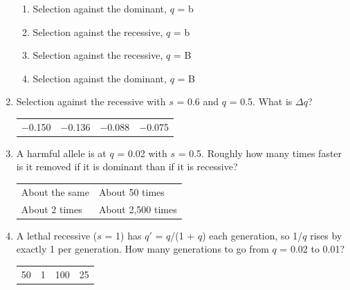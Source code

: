 \documentclass[11pt]{article}
\newcommand{\work}[1]{\par\vspace{#1}}
\begin{document}
\begin{enumerate}[label=\textbf{\arabic*.}, leftmargin=2em, itemsep=1.4em]
\par\smallskip
\begin{enumerate}[label={}, leftmargin=2.4em, labelwidth=0pt, itemsep=2pt, topsep=0pt]
\item \hspace*{-2.4em}Selection against the dominant, \(q\) = b
\item \hspace*{-2.4em}Selection against the recessive, \(q\) = b
\item \hspace*{-2.4em}Selection against the recessive, \(q\) = B
\item \hspace*{-2.4em}Selection against the dominant, \(q\) = B
\end{enumerate}
\item Selection against the recessive with \(s\) = 0.6 and \(q\) = 0.5. What is \(\Delta q\)?
\par\smallskip\noindent\begin{tabularx}{\linewidth}{@{}YYYY@{}}
\(-\)0.150 & \(-\)0.136 & \(-\)0.088 & \(-\)0.075 \\
\end{tabularx}
\work{1.6cm}
\item A harmful allele is at \(q\) = 0.02 with \(s\) = 0.5. Roughly how many times faster is it removed if it is dominant than if it is recessive?
\par\smallskip\noindent\begin{tabularx}{\linewidth}{@{}YY@{}}
About the same & About 50 times \\[3pt]
About 2 times & About 2{,}500 times \\
\end{tabularx}
\item A lethal recessive (\(s\) = 1) has \(q'\) = \(q\)/(1 + \(q\)) each generation, so 1/\(q\) rises by exactly 1 per generation. How many generations to go from \(q\) = 0.02 to 0.01?
\par\smallskip\noindent\begin{tabularx}{\linewidth}{@{}YYYY@{}}
50 & 1 & 100 & 25 \\

\end{tabularx}
\end{enumerate}
\end{document}
